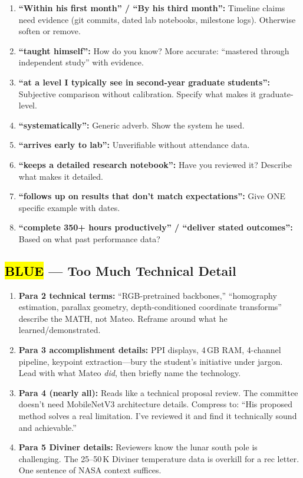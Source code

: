 \documentclass[12pt]{article}
\newcommand{\blu}[1]{{\sethlcolor{cyan!30}\hl{#1}}}
\begin{document}
\begin{enumerate}
\item \textbf{``Within his first month'' / ``By his third month'':} Timeline claims need evidence (git commits, dated lab notebooks, milestone logs). Otherwise soften or remove.
\item \textbf{``taught himself'':} How do you know? More accurate: ``mastered through independent study'' with evidence.
\item \textbf{``at a level I typically see in second-year graduate students'':} Subjective comparison without calibration. Specify what makes it graduate-level.
\item \textbf{``systematically'':} Generic adverb. Show the system he used.
\item \textbf{``arrives early to lab'':} Unverifiable without attendance data.
\item \textbf{``keeps a detailed research notebook'':} Have you reviewed it? Describe what makes it detailed.
\item \textbf{``follows up on results that don't match expectations'':} Give ONE specific example with dates.
\item \textbf{``complete 350+ hours productively'' / ``deliver stated outcomes'':} Based on what past performance data?
\end{enumerate}

\subsection*{\blu{BLUE} --- Too Much Technical Detail}

\begin{enumerate}
\item \textbf{Para 2 technical terms:} ``RGB-pretrained backbones,'' ``homography estimation, parallax geometry, depth-conditioned coordinate transforms'' describe the MATH, not Mateo. Reframe around what he learned/demonstrated.
\item \textbf{Para 3 accomplishment details:} PPI displays, 4\,GB RAM, 4-channel pipeline, keypoint extraction---bury the student's initiative under jargon. Lead with what Mateo \emph{did}, then briefly name the technology.
\item \textbf{Para 4 (nearly all):} Reads like a technical proposal review. The committee doesn't need MobileNetV3 architecture details. Compress to: ``His proposed method solves a real limitation. I've reviewed it and find it technically sound and achievable.''
\item \textbf{Para 5 Diviner details:} Reviewers know the lunar south pole is challenging. The 25--50\,K Diviner temperature data is overkill for a rec letter. One sentence of NASA context suffices.
\end{enumerate}
\end{document}
